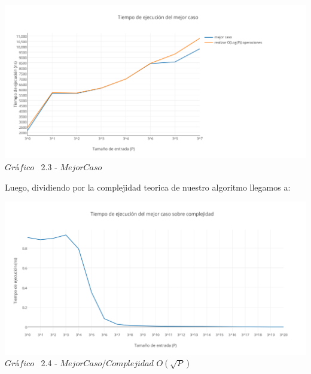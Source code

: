 \vspace*{0.3cm} \vspace*{0.3cm}
  \begin{center}
\includegraphics[scale=0.65]{./EJ2/mejorcaso2.png}
{$Gr$\'a$fico$ \ 2.3 - $Mejor Caso$}
  \end{center}
  \vspace*{0.3cm}


Luego, dividiendo por la complejidad teorica de nuestro algoritmo llegamos a:\\

\vspace*{0.3cm} \vspace*{0.3cm}
  \begin{center}
\includegraphics[scale=0.65]{./EJ2/mejorcaso1.png}
{$Gr$\'a$fico$ \ 2.4 - $Mejor Caso / Complejidad$ $O(\sqrt{P})$}
  \end{center}
  \vspace*{0.3cm}

